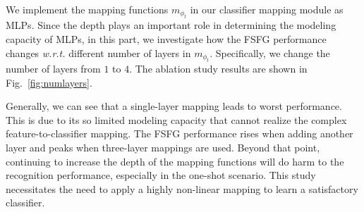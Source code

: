 \documentclass[10pt,twocolumn,letterpaper]{article}
\begin{document}
We implement the mapping functions $m_{{\phi}_t}$ in our classifier mapping module as MLPs. Since the depth plays an important role in determining the modeling capacity of MLPs, in this part, we investigate how the FSFG performance changes \emph{w.r.t.} different number of layers in $m_{{\phi}_t}$. Specifically, we change the number of layers from $1$ to $4$. The ablation study results are shown in Fig.~\ref{fig:numlayers}.


Generally, we can see that a single-layer mapping leads to worst performance. This is due to its so limited modeling capacity that cannot realize the complex feature-to-classifier mapping. The FSFG performance rises when adding another layer and peaks when three-layer mappings are used. Beyond that point, continuing to increase the depth of the mapping functions will do harm to the recognition performance, especially in the one-shot scenario. This study necessitates the need to apply a highly non-linear mapping to learn a satisfactory classifier. 

%
\end{document}
